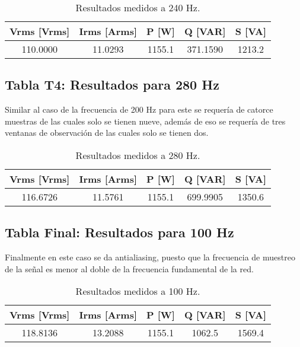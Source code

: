 \begin{table}[h!]
    \centering
    \begin{tabular}{@{}ccccc@{}}
        \toprule
        Vrms [Vrms] & Irms [Arms] & P [W] & Q [VAR] & S [VA] \\ \midrule
        110.0000 & 11.0293 & 1155.1 & 371.1590 & 1213.2 \\ 
        \bottomrule
    \end{tabular}
    \caption{Resultados medidos a 240 Hz.}
\end{table}

\subsection*{Tabla T4: Resultados para 280 Hz}
Similar al caso de la frecuencia de 200 Hz para este se requería de catorce muestras de las cuales solo se tienen nueve, además de eso se requería de tres ventanas de observación de las cuales solo se tienen dos.
\begin{table}[h!]
    \centering
    \begin{tabular}{@{}ccccc@{}}
        \toprule
        Vrms [Vrms] & Irms [Arms] & P [W] & Q [VAR] & S [VA] \\ \midrule
        116.6726 & 11.5761 & 1155.1 & 699.9905 & 1350.6  \\ 
        \bottomrule
    \end{tabular}
    \caption{Resultados medidos a 280 Hz.}
\end{table}

\subsection*{Tabla Final: Resultados para 100 Hz}
Finalmente en este caso se da antialiasing, puesto que la frecuencia de muestreo de la señal es menor al doble de la frecuencia fundamental de la red.
\begin{table}[h!]
    \centering
    \begin{tabular}{@{}ccccc@{}}
        \toprule
        Vrms [Vrms] & Irms [Arms] & P [W] & Q [VAR] & S [VA] \\ \midrule
        118.8136 & 13.2088 & 1155.1 & 1062.5 & 1569.4 \\ 
        \bottomrule
    \end{tabular}
    \caption{Resultados medidos a 100 Hz.}
\end{table}
